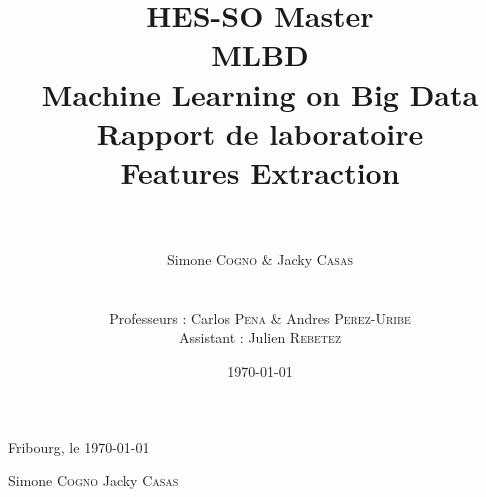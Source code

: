 \documentclass[a4paper, 12pt]{report}
\title{\huge{HES-SO Master} \\ \Huge{\textbf{\textsc{MLBD}}} \\
\LARGE{Machine Learning on Big Data} \\
\vspace{2cm} \huge{\textbf{Rapport de laboratoire}} \\ 
\huge{Features Extraction}}
\author{\\ \\ Simone \textsc{Cogno} \& Jacky \textsc{Casas} \\
\\ \\
Professeurs : Carlos \textsc{Pena} \& Andres \textsc{Perez-Uribe} \\
Assistant : Julien \textsc{Rebetez}}
\date{\today}
\begin{document}
\maketitle %
\newpage
\tableofcontents
\newpage

%

%
%
%


\vspace{3cm}
Fribourg, le \today

\vspace{1cm}

\hspace{2cm} Simone \textsc{Cogno} \hspace{4cm} Jacky \textsc{Casas}

\vspace{2cm}


%
\end{document}
